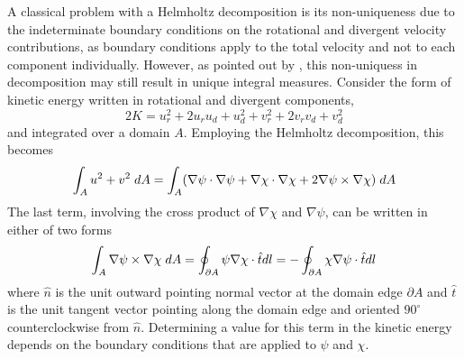 \documentclass[draft]{agujournal2019}
\begin{document}
A classical problem with a Helmholtz decomposition is its non-uniqueness due to the indeterminate boundary conditions on the rotational and divergent velocity contributions, as boundary conditions apply to the total velocity and not to each component individually. However, as pointed out by \cite{Fox-Kemper2003}, this non-uniquess in decomposition may still result in unique integral measures. Consider the form of kinetic energy written in rotational and divergent components,
\begin{equation}
    2K = u_r^2 + 2u_ru_d + u_d^2 +v_r^2 + 2v_rv_d + v_d^2
\end{equation}
and integrated over a domain $A$. Employing the Helmholtz decomposition, this becomes
\begin{equation}
    \int_A u^2 + v^2 \hspace{1mm}dA = \int_A (\nabla \psi \cdot \nabla \psi + \nabla \chi \cdot \nabla \chi + 2\nabla\psi \times \nabla \chi) \hspace{1mm}dA
\end{equation}
The last term, involving the cross product of $\nabla \chi$ and $\nabla \psi$, can be written in either of two forms
\begin{equation}
    \int_A \nabla\psi \times \nabla \chi \hspace{1mm}dA = \oint_{\partial A} \psi \nabla \chi \cdot \hat{t} dl = - \oint_{\partial A} \chi \nabla \psi \cdot \hat{t} dl \label{eq:energy cross product term}
\end{equation}
where $\hat{n}$ is the unit outward pointing normal vector at the domain edge $\partial A$ and $\hat{t}$ is the unit tangent vector pointing along the domain edge and oriented $90^\circ$  counterclockwise from $\hat{n}$. Determining a value for this term in the kinetic energy depends on the boundary conditions that are applied to $\psi$ and $\chi$.
\end{document}
